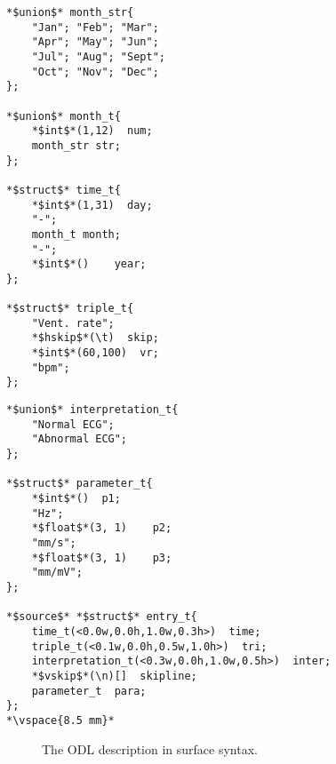 \newsavebox{\thirdlisting}
\begin{lrbox}{\thirdlisting}%
\small
\begin{lstlisting}[basicstyle=\tiny,]
*$union$* month_str{
    "Jan"; "Feb"; "Mar";
    "Apr"; "May"; "Jun";
    "Jul"; "Aug"; "Sept";
    "Oct"; "Nov"; "Dec";
};

*$union$* month_t{
    *$int$*(1,12)  num;
    month_str str;
};

*$struct$* time_t{
    *$int$*(1,31)  day;
    "-";
    month_t month;
    "-";
    *$int$*()    year;
};

*$struct$* triple_t{
    "Vent. rate";
    *$hskip$*(\t)  skip;
    *$int$*(60,100)  vr;
    "bpm";
};
\end{lstlisting}
\end{lrbox}
\newsavebox{\forthlisting}
\begin{lrbox}{\forthlisting}
\begin{lstlisting}[basicstyle=\tiny,]
*$union$* interpretation_t{
    "Normal ECG";
    "Abnormal ECG";
};

*$struct$* parameter_t{
    *$int$*()  p1;
    "Hz";
    *$float$*(3, 1)    p2;
    "mm/s";
    *$float$*(3, 1)    p3;
    "mm/mV";
};

*$source$* *$struct$* entry_t{
    time_t(<0.0w,0.0h,1.0w,0.3h>)  time;
    triple_t(<0.1w,0.0h,0.5w,1.0h>)  tri;
    interpretation_t(<0.3w,0.0h,1.0w,0.5h>)  inter;
    *$vskip$*(\n)[]  skipline;
    parameter_t  para;
};
*\vspace{8.5 mm}*
\end{lstlisting}
\end{lrbox}

\begin{figure}[ht]
\centering
\subfloat{
\scalebox{1.35}{\usebox{\thirdlisting}}
}
\subfloat{
\scalebox{1.35}{\usebox{\forthlisting}}
}
\caption{The ODL description in surface syntax.}
\label{fig:running-odl-surface}
\end{figure}

